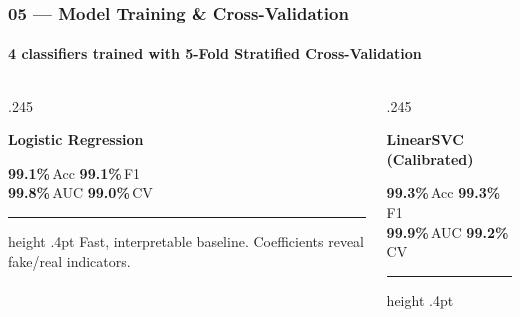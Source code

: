 \documentclass[aspectratio=169,10pt]{beamer}
\begin{document}
\begin{frame}[t]
\frametitle{05 --- Model Training \& Cross-Validation}
\framesubtitle{4 classifiers trained with 5-Fold Stratified Cross-Validation}
\vspace{.04cm}
\begin{columns}[T]
\begin{column}{.245\textwidth}
  \begin{tcolorbox}[mycard={ABlue}{ABlue},top=0pt,left=0pt,right=0pt,bottom=3pt]
    \begin{tcolorbox}[statbox={ABlue},arc=0pt,top=3pt,bottom=3pt]
      {\scriptsize\bfseries\color{white}Logistic Regression}
    \end{tcolorbox}
    \vspace{2pt}\centering
    {\footnotesize\bfseries\color{ABlue}99.1\%}\,{\tiny\color{Slate}Acc}\quad
    {\footnotesize\bfseries\color{ABlue}99.1\%}\,{\tiny\color{Slate}F1}\\[1pt]
    {\footnotesize\bfseries\color{ABlue}99.8\%}\,{\tiny\color{Slate}AUC}\quad
    {\footnotesize\bfseries\color{ABlue}99.0\%}\,{\tiny\color{Slate}CV}\\
    \vspace{3pt}\hrule height .4pt\vspace{3pt}
    {\tiny\color{Slate}Fast, interpretable baseline. Coefficients reveal fake/real indicators.}
  \end{tcolorbox}
\end{column}
\begin{column}{.245\textwidth}
  \begin{tcolorbox}[mycard={APurple}{APurple},top=0pt,left=0pt,right=0pt,bottom=3pt]
    \begin{tcolorbox}[statbox={APurple},arc=0pt,top=3pt,bottom=3pt]
      {\scriptsize\bfseries\color{white}LinearSVC (Calibrated)}
    \end{tcolorbox}
    \vspace{2pt}\centering
    {\footnotesize\bfseries\color{APurple}99.3\%}\,{\tiny\color{Slate}Acc}\quad
    {\footnotesize\bfseries\color{APurple}99.3\%}\,{\tiny\color{Slate}F1}\\[1pt]
    {\footnotesize\bfseries\color{APurple}99.9\%}\,{\tiny\color{Slate}AUC}\quad
    {\footnotesize\bfseries\color{APurple}99.2\%}\,{\tiny\color{Slate}CV}\\
    \vspace{3pt}\hrule height .4pt\vspace{3pt}

\end{tcolorbox}
\end{column}
\end{columns}
\end{frame}
\end{document}
